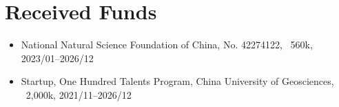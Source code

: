\section{Received Funds}

\begin{itemize}
\item National Natural Science Foundation of China, No. 42274122, \textyen\ 560k, 2023/01--2026/12
\item Startup, One Hundred Talents Program, China University of Geosciences, \textyen\ 2,000k, 2021/11--2026/12
\end{itemize}
